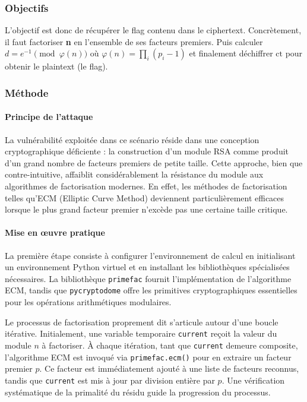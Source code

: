     \subsubsection{Objectifs}
    L'objectif est donc de récupérer le flag contenu dans le ciphertext.
    Concrètement, il faut factoriser \textbf{n} en l'ensemble de ses facteurs
    premiers. Puis calculer $d = e^{-1} \pmod{\varphi(n)}$ où
    $\varphi(n)=\prod_i (p_i-1)$ et finalement déchiffrer
    $\mathrm{ct}$ pour obtenir le plaintext (le flag).

    \subsubsection{Méthode}
    \paragraph{Principe de l'attaque}
    La vulnérabilité exploitée dans ce scénario réside dans une conception
    cryptographique déficiente : la construction d'un module RSA comme
    produit d'un grand nombre de facteurs premiers de petite taille. Cette
    approche, bien que contre-intuitive, affaiblit considérablement la
    résistance du module aux algorithmes de factorisation modernes. En
    effet, les méthodes de factorisation telles qu'ECM (Elliptic Curve
    Method) deviennent particulièrement efficaces lorsque le plus grand
    facteur premier n'excède pas une certaine taille critique.

    \paragraph{Mise en œuvre pratique}
    La première étape consiste à configurer l'environnement de calcul en
    initialisant un environnement Python virtuel et en installant les
    bibliothèques spécialisées nécessaires. La bibliothèque
    \texttt{primefac} fournit l'implémentation de l'algorithme ECM,
    tandis que \texttt{pycryptodome} offre les primitives cryptographiques
    essentielles pour les opérations arithmétiques modulaires.

    Le processus de factorisation proprement dit s'articule autour d'une
    boucle itérative. Initialement, une variable temporaire
    \texttt{current} reçoit la valeur du module $n$ à factoriser. À chaque
    itération, tant que \texttt{current} demeure composite, l'algorithme
    ECM est invoqué via \texttt{primefac.ecm()} pour en extraire un facteur
    premier $p$. Ce facteur est immédiatement ajouté à une liste de
    facteurs reconnus, tandis que \texttt{current} est mis à jour par
    division entière par $p$. Une vérification systématique de la primalité
    du résidu guide la progression du processus.

